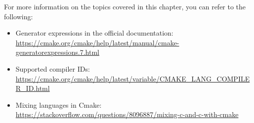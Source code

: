 For more information on the topics covered in this chapter, you can refer to the following:

\begin{itemize}
\item
Generator expressions in the official documentation: \url{https://cmake.org/cmake/help/latest/manual/cmake-generatorexpressions.7.html}

\item
Supported compiler IDs: \url{https://cmake.org/cmake/help/latest/variable/CMAKE_LANG_COMPILER_ID.html}

\item
Mixing languages in Cmake: \url{https://stackoverflow.com/questions/8096887/mixing-c-and-c-with-cmake}
\end{itemize}